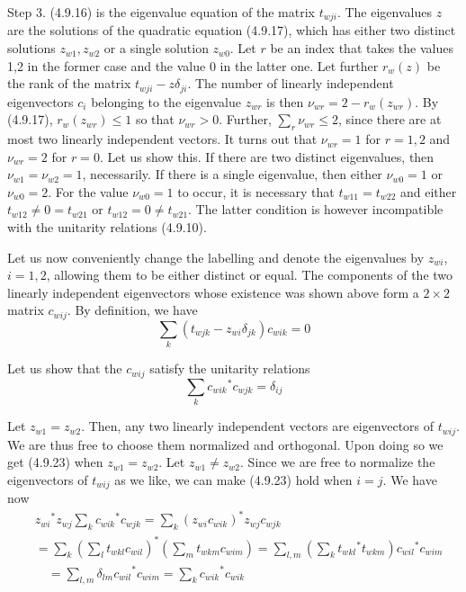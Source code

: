 \documentclass{article}
\begin{document}
Step 3. (4.9.16) is the eigenvalue equation of the matrix $t_{w j i}$. The eigenvalues $z$ are the solutions of the quadratic equation (4.9.17), which has either two distinct solutions $z_{w 1}, z_{w 2}$ or a single solution $z_{w 0}$. Let $r$ be an index that takes the values 1,2 in the former case and the value 0 in the latter one. Let further $r_{w}(z)$ be the rank of the matrix $t_{w j i}-z \delta_{j i}$. The number of linearly independent eigenvectors $c_{i}$ belonging to the eigenvalue $z_{w r}$ is then $\nu_{w r}=2-r_{w}\left(z_{w r}\right)$. By (4.9.17), $r_{w}\left(z_{w r}\right) \leq 1$ so that $\nu_{w r}>0$. Further, $\sum_{r} \nu_{w r} \leq 2$, since there are at most two linearly independent vectors. It turns out that $\nu_{w r}=1$ for $r=1,2$ and $\nu_{w r}=2$ for $r=0$. Let us show this. If there are two distinct eigenvalues, then $\nu_{w 1}=\nu_{w 2}=1$, necessarily. If there is a single eigenvalue, then either $\nu_{w 0}=1$ or $\nu_{w 0}=2$. For the value $\nu_{w 0}=1$ to occur, it is necessary that $t_{w 11}=t_{w 22}$ and either $t_{w 12} \neq 0=t_{w 21}$ or $t_{w 12}=0 \neq t_{w 21}$. The latter condition is however incompatible with the unitarity relations (4.9.10).

Let us now conveniently change the labelling and denote the eigenvalues by $z_{w i}$, $i=1,2$, allowing them to be either distinct or equal. The components of the two linearly independent eigenvectors whose existence was shown above form a $2 \times 2$ matrix $c_{w i j}$. By definition, we have
$$
\begin{equation*}
\sum_{k}\left(t_{w j k}-z_{w i} \delta_{j k}\right) c_{w i k}=0 \tag{4.9.22}
\end{equation*}
$$

Let us show that the $c_{w i j}$ satisfy the unitarity relations
$$
\begin{equation*}
\sum_{k} c_{w i k}{ }^{*} c_{w j k}=\delta_{i j} \tag{4.9.23}
\end{equation*}
$$

Let $z_{w 1}=z_{w 2}$. Then, any two linearly independent vectors are eigenvectors of $t_{w i j}$. We are thus free to choose them normalized and orthogonal. Upon doing so we get (4.9.23) when $z_{w 1}=z_{w 2}$. Let $z_{w 1} \neq z_{w 2}$. Since we are free to normalize the eigenvectors of $t_{w i j}$ as we like, we can make (4.9.23) hold when $i=j$. We have now
$$
\begin{align*}
& z_{w i}{ }^{*} z_{w j} \sum_{k} c_{w i k}{ }^{*} c_{w j k}=\sum_{k}\left(z_{w i} c_{w i k}\right)^{*} z_{w j} c_{w j k}  \tag{4.9.24}\\
& =\sum_{k}\left(\sum_{l} t_{w k l} c_{w i l}\right)^{*}\left(\sum_{m} t_{w k m} c_{w i m}\right)=\sum_{l, m}\left(\sum_{k} t_{w k l}{ }^{*} t_{w k m}\right) c_{w i l}{ }^{*} c_{w i m} \\
& \quad=\sum_{l, m} \delta_{l m} c_{w i l}{ }^{*} c_{w i m}=\sum_{k} c_{w i k}{ }^{*} c_{w i k}
\end{align*}
$$
\end{document}
